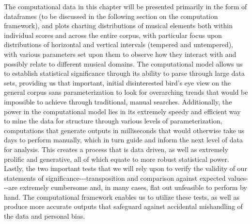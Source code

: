 The computational data in this chapter will be presented primarily in
the form of dataframes (to be discussed in the following section on the
computation framework), and plots charting distributions of musical
elements both within individual scores and across the entire corpus,
with particular focus upon distributions of horizontal and vertical
intervals (tempered and untempered), with various parameters set upon
them to observe how they interact with and possibly relate to different
musical domains. The computational model allows us to establish
statistical significance through its ability to parse through large data
sets, providing us that important, initial disinterested bird's eye view
on the general corpus sans parameterization to look for overarching
trends that would be impossible to achieve through traditional, manual
searches. Additionally, the power in the computational model lies in its
extremely speedy and efficient way to mine the data for structure
through various levels of parameterization, computations that generate
outputs in milliseconds that would otherwise take us days to perform
manually, which in turn guide and inform the next level of data for
analysis. This creates a process that is data driven, as well as
extremely prolific and generative, all of which equate to more robust
statistical power. Lastly, the two important tests that we will rely
upon to verify the validity of our statements of
significance-\/-\/-transposition and comparison against expected
values-\/-\/-are extremely cumbersome and, in many cases, flat out
unfeasible to perform by hand. The computational framework enables us to
utilize these tests, as well as produce more accurate outputs that
safeguard against accidental mishandling of the data and personal bias.

